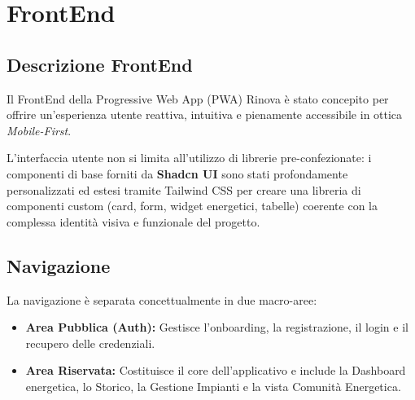 \setcounter{section}{3}
\setlength{\parindent}{0pt}
\setlength{\parskip}{6pt}

\section{FrontEnd}

\subsection{Descrizione FrontEnd}
Il FrontEnd della Progressive Web App (PWA) Rinova è stato concepito per offrire un'esperienza utente reattiva, intuitiva e pienamente accessibile in ottica \textit{Mobile-First}. 

L'interfaccia utente non si limita all'utilizzo di librerie pre-confezionate: i componenti di base forniti da \textbf{Shadcn UI} sono stati profondamente personalizzati ed estesi tramite Tailwind CSS per creare una libreria di componenti custom (card, form, widget energetici, tabelle) coerente con la complessa identità visiva e funzionale del progetto.

\subsection{Navigazione}
La navigazione è separata concettualmente in due macro-aree:
\begin{itemize}
    \item \textbf{Area Pubblica (Auth):} Gestisce l'onboarding, la registrazione, il login e il recupero delle credenziali.
    \item \textbf{Area Riservata:} Costituisce il core dell'applicativo e include la Dashboard energetica, lo Storico, la Gestione Impianti e la vista Comunità Energetica.
\end{itemize}

